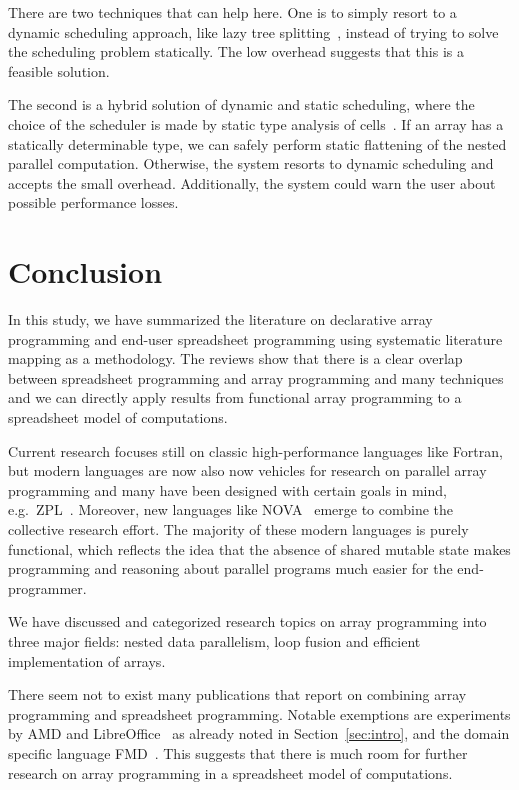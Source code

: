 \documentclass[a4paper]{article}
\begin{document}
There are two techniques that can help here. One is to simply resort to a dynamic scheduling approach, like lazy tree splitting~\cite{Bergstrom:2010:LTS:1863543.1863558}, instead of trying to solve the scheduling problem statically. The low overhead suggests that this is a feasible solution.

The second is a hybrid solution of dynamic and static scheduling, where the choice of the scheduler is made by static type analysis of cells~\cite{Abraham:2006:TIS:1140335.1140346, Cheng2012Abstract, Cheng2015Static}. If an array has a statically determinable type, we can safely perform static flattening of the nested parallel computation. Otherwise, the system resorts to dynamic scheduling and accepts the small overhead. Additionally, the system could warn the user about possible performance losses.

\section{Conclusion}
\label{sec:conclusion}

In this study, we have summarized the literature on declarative array programming and end-user spreadsheet programming using systematic literature mapping as a methodology. The reviews show that there is a clear overlap between spreadsheet programming and array programming and many techniques and we can directly apply results from functional array programming to a spreadsheet model of computations.

Current research focuses still on classic high-performance languages like Fortran, but modern languages are now also now vehicles for research on parallel array programming and many have been designed with certain goals in mind, e.g.\ ZPL~\cite{Snyder2007Design}. Moreover, new languages like NOVA~\cite{Collins:2014:NFL:2627373.2627375} emerge to combine the collective research effort. The majority of these modern languages is purely functional, which reflects the idea that the absence of shared mutable state makes programming and reasoning about parallel programs much easier for the end-programmer.

We have discussed and categorized research topics on array programming into three major fields: nested data parallelism, loop fusion and efficient implementation of arrays.

There seem not to exist many publications that report on combining array programming and spreadsheet programming. Notable exemptions are experiments by AMD and LibreOffice~\cite{Trudeau2015Collaboration} as already noted in Section~\ref{sec:intro}, and the domain specific language FMD~\cite{Benfield:2009:FFD:1668113.1668121}. This suggests that there is much room for further research on array programming in a spreadsheet model of computations.
\end{document}
